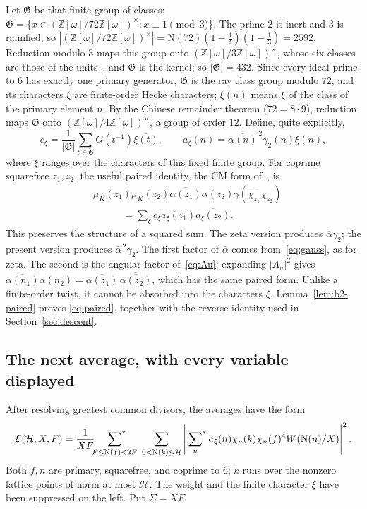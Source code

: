 \documentclass[11pt]{article}
\numberwithin{equation}{section}
\newcommand{\OO}{\mathbb Z[\omega]}
\newcommand{\N}{\mathrm N}
\newcommand{\muk}{\mu_K}
\newcommand{\E}{\mathcal E}
\newcommand{\ssum}{\sideset{}{^*}\sum}
\begin{document}
Let $\mathfrak G$ be that finite group of classes:
$\mathfrak G=\{x\in(\OO/72\OO)^\times:x\equiv1\pmod3\}$. The prime $2$ is inert and $3$ is
ramified, so $|(\OO/72\OO)^\times|=\N(72)(1-\frac14)(1-\frac13)=2592$. Reduction modulo $3$
maps this group onto $(\OO/3\OO)^\times$, whose six classes are those of the
units~\cite[Proposition~11]{QF}, and $\mathfrak G$ is the kernel; so $|\mathfrak G|=432$.
Since every ideal prime to $6$ has exactly one primary generator, $\mathfrak G$ is the ray
class group modulo $72$, and its characters $\xi$ are finite-order Hecke characters; $\xi(n)$
means $\xi$ of the class of the primary element $n$. By the Chinese remainder theorem
($72=8\cdot9$), reduction maps $\mathfrak G$ onto $(\OO/4\OO)^\times$, a group of order $12$.
Define, quite explicitly,
\begin{equation}\label{eq:d037}
 c_\xi=\frac1{|\mathfrak G|}\sum_{t\in\mathfrak G}
                         G(t^{-1})\overline{\xi(t)},\qquad
 a_\xi(n)=\overline{\alpha(n)}^{\,2}\gamma_2(n)\xi(n),
\end{equation}
where $\xi$ ranges over the characters of this fixed finite group.
For coprime squarefree $z_1,z_2$, the useful paired identity, the CM form of~\cite[(4.15)]{OAI1112}, is
\begin{equation}\label{eq:paired}
\begin{split}
 &\muk(z_1)\muk(z_2)\overline{\alpha(z_1)}\alpha(z_2)
       \gamma(\overline{\chi_{z_1}}\chi_{z_2})\\
 &\hspace{3em}=\sum_\xi c_\xi a_\xi(z_1)\overline{a_\xi(z_2)}.
\end{split}
\end{equation}
This preserves the structure of a squared sum. The zeta version produces
$\overline\alpha\gamma_2$; the present version produces
$\overline\alpha^{\,2}\gamma_2$. The first factor of $\overline\alpha$ comes
from~\eqref{eq:gauss}, as for zeta. The second is the angular factor of~\eqref{eq:Au}:
expanding $|A_u|^2$ gives $\overline{\alpha(n_1)}\alpha(n_2)=\overline{\alpha(z_1)}\,
\overline{\overline{\alpha(z_2)}}$, which has the same paired form. Unlike a finite-order
twist, it cannot be absorbed into the characters $\xi$. Lemma~\ref{lem:b2-paired} proves
\eqref{eq:paired}, together with the reverse identity used in Section~\ref{sec:descent}.

\subsection{The next average, with every variable displayed}
After resolving greatest common divisors, the averages have the form
\begin{equation}\label{eq:energy}
 \E(\mathcal H,X,F)=\frac1{XF}
 \ssum_{F\le\N(f)<2F}\ \sum_{0<\N(k)\le\mathcal H}
 \left|\ssum_n a_\xi(n)\chi_n(k)\chi_n(f)^4
                       W(\N(n)/X)\right|^2.
\end{equation}
Both $f,n$ are primary, squarefree, and coprime to $6$; $k$ runs over
the nonzero lattice points of norm at most $\mathcal H$. The weight and the finite character $\xi$ have been
suppressed on the left. Put $\Sigma=XF$.
\end{document}
